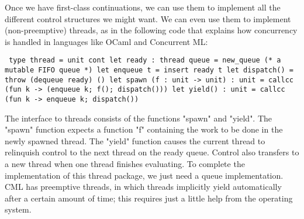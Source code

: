 Once we have first-class continuations, we can use them to implement
all the different control structures we might want. We can even use them
to implement (non-preemptive) threads, as in the following code that explains how
concurrency is handled in languages like OCaml and Concurrent ML:

\begin{code}
\tt
   type thread = unit cont
\mbox{}
   let ready : thread queue = new\_queue (* a mutable FIFO queue *)
   let enqueue t = insert ready t
   let dispatch() = throw (dequeue ready) ()
\mbox{}
   let spawn (f : unit -> unit) : unit =
     callcc (fun k -> (enqueue k; f(); dispatch()))
   let yield() : unit = callcc (fun k -> enqueue k; dispatch())
\end{code}

The interface to threads consists of the functions "spawn" and "yield". The
"spawn" function expects a function "f" containing the work to be done in the
newly spawned thread. The "yield" function causes the current thread to
relinquish control to the next thread on the ready queue. Control also
transfers to a new thread when one thread finishes evaluating. To complete
the implementation of this thread package, we just need a queue
implementation. CML has preemptive threads, in which threads implicitly
yield automatically after a certain amount of time; this 
requires just a little help from the operating system.

